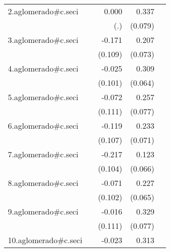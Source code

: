 {\begin{longtable}{l*{4}{D{.}{.}{-1}}}
\addlinespace
2.aglomerado#c.seci&                     &       0.000         &       0.337\sym{***}&                     \\
            &                     &         (.)         &     (0.079)         &                     \\
\addlinespace
3.aglomerado#c.seci&                     &      -0.171         &       0.207\sym{**} &                     \\
            &                     &     (0.109)         &     (0.073)         &                     \\
\addlinespace
4.aglomerado#c.seci&                     &      -0.025         &       0.309\sym{***}&                     \\
            &                     &     (0.101)         &     (0.064)         &                     \\
\addlinespace
5.aglomerado#c.seci&                     &      -0.072         &       0.257\sym{***}&                     \\
            &                     &     (0.111)         &     (0.077)         &                     \\
\addlinespace
6.aglomerado#c.seci&                     &      -0.119         &       0.233\sym{**} &                     \\
            &                     &     (0.107)         &     (0.071)         &                     \\
\addlinespace
7.aglomerado#c.seci&                     &      -0.217\sym{*}  &       0.123         &                     \\
            &                     &     (0.104)         &     (0.066)         &                     \\
\addlinespace
8.aglomerado#c.seci&                     &      -0.071         &       0.227\sym{***}&                     \\
            &                     &     (0.102)         &     (0.065)         &                     \\
\addlinespace
9.aglomerado#c.seci&                     &      -0.016         &       0.329\sym{***}&                     \\
            &                     &     (0.111)         &     (0.077)         &                     \\
\addlinespace
10.aglomerado#c.seci&                     &      -0.023         &       0.313\sym{***}&                     \\

\end{longtable}}
